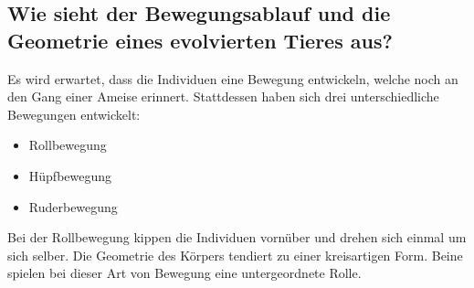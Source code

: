     \subsection{Wie sieht der Bewegungsablauf und die Geometrie eines evolvierten Tieres aus?}

      Es wird erwartet, dass die Individuen eine Bewegung entwickeln,
      welche noch an den Gang einer Ameise erinnert.
      Stattdessen haben sich drei unterschiedliche Bewegungen entwickelt:

      \begin{itemize}
        \item Rollbewegung
        \item Hüpfbewegung
        \item Ruderbewegung
      \end{itemize}

      Bei der Rollbewegung kippen die Individuen vornüber und drehen sich einmal um sich selber.
      Die Geometrie des Körpers tendiert zu einer kreisartigen Form.
      Beine spielen bei dieser Art von Bewegung eine untergeordnete Rolle.

